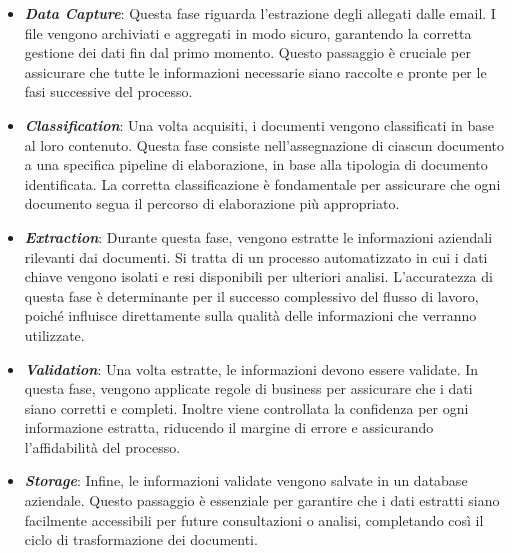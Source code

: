 \begin{itemize}
  \item \textbf{\emph{Data Capture}}: Questa fase riguarda l'estrazione degli allegati dalle email. I file vengono archiviati e aggregati in modo sicuro, garantendo la corretta gestione dei dati fin dal primo momento. Questo passaggio è cruciale per assicurare che tutte le informazioni necessarie siano raccolte e pronte per le fasi successive del processo.
  
  \item \textbf{\emph{Classification}}: Una volta acquisiti, i documenti vengono classificati in base al loro contenuto. Questa fase consiste nell'assegnazione di ciascun documento a una specifica pipeline di elaborazione, in base alla tipologia di documento identificata. La corretta classificazione è fondamentale per assicurare che ogni documento segua il percorso di elaborazione più appropriato.

  \item \textbf{\emph{Extraction}}: Durante questa fase, vengono estratte le informazioni aziendali rilevanti dai documenti. Si tratta di un processo automatizzato in cui i dati chiave vengono isolati e resi disponibili per ulteriori analisi. L'accuratezza di questa fase è determinante per il successo complessivo del flusso di lavoro, poiché influisce direttamente sulla qualità delle informazioni che verranno utilizzate.

  \item \textbf{\emph{Validation}}: Una volta estratte, le informazioni devono essere validate. In questa fase, vengono applicate regole di business per assicurare che i dati siano corretti e completi. Inoltre viene controllata la confidenza per ogni informazione estratta, riducendo il margine di errore e assicurando l'affidabilità del processo.

  \item \textbf{\emph{Storage}}: Infine, le informazioni validate vengono salvate in un database aziendale. Questo passaggio è essenziale per garantire che i dati estratti siano facilmente accessibili per future consultazioni o analisi, completando così il ciclo di trasformazione dei documenti.
\end{itemize}

